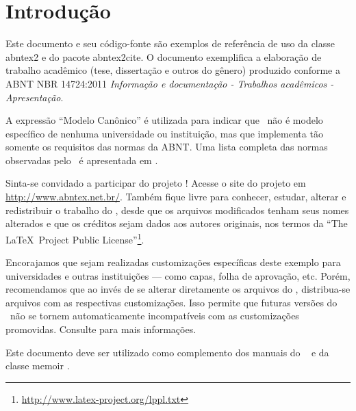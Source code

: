 \documentclass[
	12pt,				%
	openright,			%
	twoside,			%
	a4paper,			%
	english,			%
	french,				%
	spanish,			%
	brazil				%
	]{abntex2}
\begin{document}
\tableofcontents*
\cleardoublepage



\textual

\chapter{Introdução}

Este documento e seu código-fonte são exemplos de referência de uso da classe
\textsf{abntex2} e do pacote \textsf{abntex2cite}. O documento 
exemplifica a elaboração de trabalho acadêmico (tese, dissertação e outros do
gênero) produzido conforme a ABNT NBR 14724:2011 \emph{Informação e documentação
- Trabalhos acadêmicos - Apresentação}.

A expressão ``Modelo Canônico'' é utilizada para indicar que \abnTeX\ não é
modelo específico de nenhuma universidade ou instituição, mas que implementa tão
somente os requisitos das normas da ABNT. Uma lista completa das normas
observadas pelo \abnTeX\ é apresentada em .

Sinta-se convidado a participar do projeto \abnTeX! Acesse o site do projeto em
\url{http://www.abntex.net.br/}. Também fique livre para conhecer,
estudar, alterar e redistribuir o trabalho do \abnTeX, desde que os arquivos
modificados tenham seus nomes alterados e que os créditos sejam dados aos
autores originais, nos termos da ``The \LaTeX\ Project Public
License''\footnote{\url{http://www.latex-project.org/lppl.txt}}.

Encorajamos que sejam realizadas customizações específicas deste exemplo para
universidades e outras instituições --- como capas, folha de aprovação, etc.
Porém, recomendamos que ao invés de se alterar diretamente os arquivos do
\abnTeX, distribua-se arquivos com as respectivas customizações.
Isso permite que futuras versões do \abnTeX~não se tornem automaticamente
incompatíveis com as customizações promovidas. Consulte
 para mais informações.

Este documento deve ser utilizado como complemento dos manuais do \abnTeX\ 
\cite{abntex2classe,abntex2cite,abntex2cite-alf} e da classe \textsf{memoir}
\cite{memoir}. 
\end{document}
